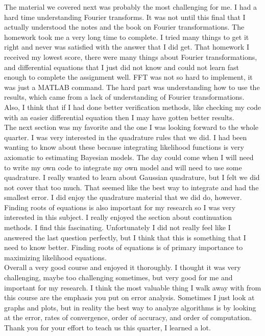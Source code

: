 \documentclass[]{article}
\begin{document}
The material we covered next was probably the most challenging for me. I had a hard time understanding Fourier transforms. It was not until this final that I actually understood the notes and the book on Fourier transformations. The homework took me a very long time to complete. I tried many things to get it right and never was satisfied with the answer that I did get. That homework I received my lowest score, there were many things about Fourier transformations, and differential equations that I just did not know and could not learn fast enough to complete the assignment well. FFT was not so hard to implement, it was just a MATLAB command. The hard part was understanding how to use the results, which came from a lack of understanding of Fourier transformations. Also, I think that if I had done better verification methods, like checking my code with an easier differential equation then I may have gotten better results. \\
The next section was my favorite and the one I was looking forward to the whole quarter. I was very interested in the quadrature rules that we did. I had been wanting to know about these because integrating likelihood functions is very axiomatic to estimating Bayesian models. The day could come when I will need to write my own code to integrate my own model and will need to use some quadrature. I really wanted to learn about Gaussian quadrature, but I felt we did not cover that too much. That seemed like the best way to integrate and had the smallest error. I did enjoy the quadrature material that we did do, however. \\
Finding roots of equations is also important for my research so I was very interested in this subject. I really enjoyed the section about continuation methods. I find this fascinating. Unfortunately I did not really feel like I answered the last question perfectly, but I think that this is something that I need to know better. Finding roots of equations is of primary importance to maximizing likelihood equations. \\

Overall a very good course and enjoyed it thoroughly. I thought it was very challenging, maybe too challenging sometimes, but very good for me and important for my research. I think the most valuable thing I walk away with from this course are the emphasis you put on error analysis. Sometimes I just look at graphs and plots, but in reality the best way to analyze algorithms is by looking at the error, rates of convergence, order of accuracy, and order of computation. Thank you for your effort to teach us this quarter, I learned a lot. 
\end{document}
